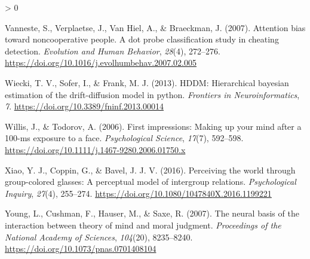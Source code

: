 \documentclass[
  english,
  man]{apa6}
\newlength{\cslhangindent}
\newenvironment{CSLReferences}[2] %
 {%
  \setlength{\parindent}{0pt}
  \ifodd #1 \everypar{\setlength{\hangindent}{\cslhangindent}}\ignorespaces\fi
  \ifnum #2 > 0
  \setlength{\parskip}{#2\baselineskip}
  \fi
 }%
 {}
\begin{document}
\begin{CSLReferences}{1}{0}
\leavevmode\hypertarget{ref-vanneste_attention_2007}{}%
Vanneste, S., Verplaetse, J., Van Hiel, A., \& Braeckman, J. (2007). Attention bias toward noncooperative people. A dot probe classification study in cheating detection. \emph{Evolution and Human Behavior}, \emph{28}(4), 272--276. \url{https://doi.org/10.1016/j.evolhumbehav.2007.02.005}

\leavevmode\hypertarget{ref-wiecki_hddm_2013}{}%
Wiecki, T. V., Sofer, I., \& Frank, M. J. (2013). {HDDM}: Hierarchical bayesian estimation of the drift-diffusion model in python. \emph{Frontiers in Neuroinformatics}, \emph{7}. \url{https://doi.org/10.3389/fninf.2013.00014}

\leavevmode\hypertarget{ref-willis_first_2006}{}%
Willis, J., \& Todorov, A. (2006). First impressions: Making up your mind after a 100-ms exposure to a face. \emph{Psychological Science}, \emph{17}(7), 592--598. \url{https://doi.org/10.1111/j.1467-9280.2006.01750.x}

\leavevmode\hypertarget{ref-xiao_perceiving_2016}{}%
Xiao, Y. J., Coppin, G., \& Bavel, J. J. V. (2016). Perceiving the world through group-colored glasses: A perceptual model of intergroup relations. \emph{Psychological Inquiry}, \emph{27}(4), 255--274. \url{https://doi.org/10.1080/1047840X.2016.1199221}

\leavevmode\hypertarget{ref-young_neural_2007}{}%
Young, L., Cushman, F., Hauser, M., \& Saxe, R. (2007). The neural basis of the interaction between theory of mind and moral judgment. \emph{Proceedings of the National Academy of Sciences}, \emph{104}(20), 8235--8240. \url{https://doi.org/10.1073/pnas.0701408104}

\end{CSLReferences}

\endgroup
\end{document}
